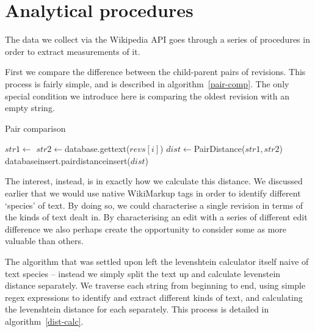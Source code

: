 \section{Analytical procedures}

The data we collect via the Wikipedia API goes through a series of
procedures in order to extract measurements of it.

First we compare the difference between the child-parent pairs of
revisions. This process is fairly simple, and is described in
algorithm~\ref{pair-comp}. The only special condition we introduce
here is comparing the oldest revision with an empty string.

\begin{algorithm}
\caption{Pair comparison}\label{pair-comp}
  \begin{algorithmic}
    \State $str1 \gets $
    \State $str2 \gets $database.gettext($revs[i]$)
    \State $dist \gets $PairDistance($str1, str2$)
    \State databaseinsert.pairdistanceinsert($dist$)  
    \EndIf
    \EndFor
  \EndProcedure
  \end{algorithmic}
\end{algorithm}

The interest, instead, is in exactly how we calculate this
distance. We discussed earlier that we would use native WikiMarkup
tags in order to identify different `species' of text. By doing so, we
could characterise a single revision in terms of the kinds of text
dealt in. By characterising an edit with a series of different edit
difference we also perhaps create the opportunity to consider some as
more valuable than others.

The algorithm that was settled upon left the levenshtein calculator
itself naive of text species -- instead we simply split the text up
and calculate levenstein distance separately. We traverse each string
from beginning to end, using simple regex expressions to identify and
extract different kinds of text, and calculating the levenshtein
distance for each separately. This process is detailed in
algorithm~\ref{dist-calc}. 

